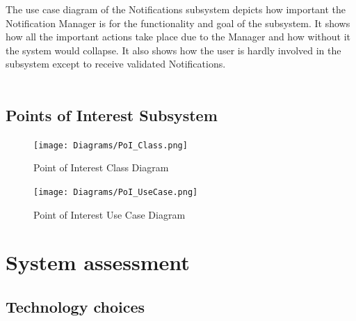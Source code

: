 \documentclass{article}
\begin{document}
				{The use case diagram of the Notifications subsystem depicts how important the Notification Manager is for the functionality and goal of the subsystem. It shows how all the important actions take place due to the Manager and how without it the system would collapse. It also shows how the user is hardly involved in the subsystem except to receive validated Notifications.\\\\}
			    

			\newpage
			\subsection{Points of Interest Subsystem}\label{subsec:points of interest}
				\begin{figure}[H]
		 \texttt{[image: Diagrams/PoI\_Class.png]}
                     \caption{Point of Interest Class Diagram}
					 \label{fig:PoI_class}
			    \end{figure}

			\begin{figure}[H]
		 \texttt{[image: Diagrams/PoI\_UseCase.png]}
                     \caption{Point of Interest Use Case Diagram}
					 \label{fig:PoI_UseCase}
			    \end{figure}

		\newpage

		\section{System assessment}\label{sec:assessment }	
			\subsection{Technology choices}\label{subsec:tech choices}
			
\end{document}

